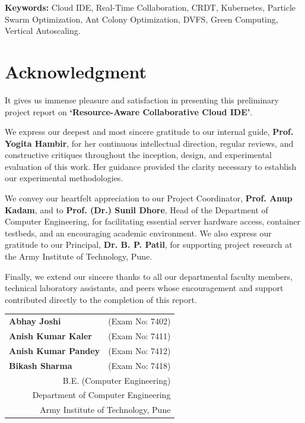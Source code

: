 \documentclass[12pt,a4paper]{report}
\begin{document}
	\vspace{0.4cm}
	\textbf{Keywords:} Cloud IDE, Real-Time Collaboration, CRDT, Kubernetes, Particle Swarm Optimization, Ant Colony Optimization, DVFS, Green Computing, Vertical Autoscaling.
	
	\clearpage
	\chapter*{Acknowledgment}
	\thispagestyle{plain}
	
	\noindent
	It gives us immense pleasure and satisfaction in presenting this preliminary project report on \textbf{`Resource-Aware Collaborative Cloud IDE'}.
	
	\vspace{0.4cm}
	We express our deepest and most sincere gratitude to our internal guide, \textbf{Prof. Yogita Hambir}, for her continuous intellectual direction, regular reviews, and constructive critiques throughout the inception, design, and experimental evaluation of this work. Her guidance provided the clarity necessary to establish our experimental methodologies.
	
	\vspace{0.4cm}
	We convey our heartfelt appreciation to our Project Coordinator, \textbf{Prof. Anup Kadam}, and to \textbf{Prof. (Dr.) Sunil Dhore}, Head of the Department of Computer Engineering, for facilitating essential server hardware access, container testbeds, and an encouraging academic environment. We also express our gratitude to our Principal, \textbf{Dr. B. P. Patil}, for supporting project research at the Army Institute of Technology, Pune.
	
	\vspace{0.4cm}
	Finally, we extend our sincere thanks to all our departmental faculty members, technical laboratory assistants, and peers whose encouragement and support contributed directly to the completion of this report.
	
	\vfill
	\begin{flushright}
		\begin{tabular}{ll}
			\textbf{Abhay Joshi} & (Exam No: 7402) \\
			\textbf{Anish Kumar Kaler} & (Exam No: 7411) \\
			\textbf{Anish Kumar Pandey} & (Exam No: 7412) \\
			\textbf{Bikash Sharma} & (Exam No: 7418) \\[0.2cm]
			\multicolumn{2}{r}{\small B.E. (Computer Engineering)} \\
			\multicolumn{2}{r}{\small Department of Computer Engineering} \\
			\multicolumn{2}{r}{\small Army Institute of Technology, Pune}
		\end{tabular}
	\end{flushright}
	\vspace{0.5cm}
	
\end{document}

